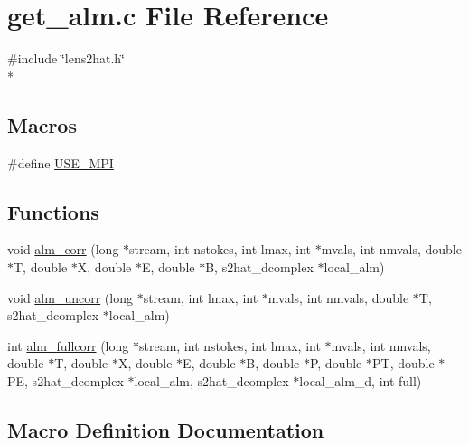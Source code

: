 \section{get\-\_\-alm.\-c File Reference}
\label{rng_2common_2get__alm_8c}
{\ttfamily \#include \char`\"{}lens2hat.\-h\char`\"{}}\\*
\subsection*{Macros}
\begin{DoxyCompactItemize}
\item 
\#define \hyperlink{rng_2common_2get__alm_8c_a3869d282031f6ea6b50fdb980b758420}{U\-S\-E\-\_\-\-M\-P\-I}
\end{DoxyCompactItemize}
\subsection*{Functions}
\begin{DoxyCompactItemize}
\item 
void \hyperlink{rng_2common_2get__alm_8c_af7e9f4ce20a8335da38808a05d0f63ae}{alm\-\_\-corr} (long $\ast$stream, int nstokes, int lmax, int $\ast$mvals, int nmvals, double $\ast$T, double $\ast$X, double $\ast$E, double $\ast$B, s2hat\-\_\-dcomplex $\ast$local\-\_\-alm)
\item 
void \hyperlink{rng_2common_2get__alm_8c_aa0789dcb4acd432d85d5c4882713444f}{alm\-\_\-uncorr} (long $\ast$stream, int lmax, int $\ast$mvals, int nmvals, double $\ast$T, s2hat\-\_\-dcomplex $\ast$local\-\_\-alm)
\item 
int \hyperlink{rng_2common_2get__alm_8c_a66df8465f1ae10f3699210532ca527e1}{alm\-\_\-fullcorr} (long $\ast$stream, int nstokes, int lmax, int $\ast$mvals, int nmvals, double $\ast$T, double $\ast$X, double $\ast$E, double $\ast$B, double $\ast$P, double $\ast$P\-T, double $\ast$P\-E, s2hat\-\_\-dcomplex $\ast$local\-\_\-alm, s2hat\-\_\-dcomplex $\ast$local\-\_\-alm\-\_\-d, int full)
\end{DoxyCompactItemize}


\subsection{Macro Definition Documentation}
